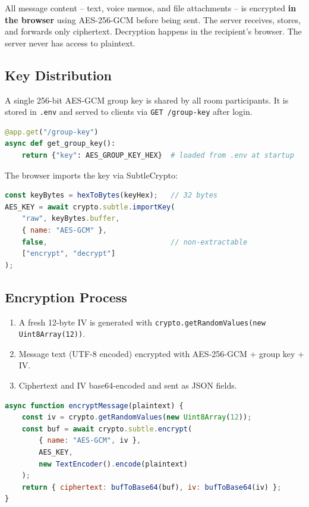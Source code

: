 \documentclass[12pt, a4paper]{article}
\begin{document}
All message content -- text, voice memos, and file attachments -- is encrypted \textbf{in the browser} using AES-256-GCM before being sent. The server receives, stores, and forwards only ciphertext. Decryption happens in the recipient's browser. The server never has access to plaintext.

\subsection{Key Distribution}

A single 256-bit AES-GCM group key is shared by all room participants. It is stored in \texttt{.env} and served to clients via \texttt{GET /group-key} after login.

\begin{lstlisting}[language=Python, caption={Group Key REST Endpoint (server.py)}]
@app.get("/group-key")
async def get_group_key():
    return {"key": AES_GROUP_KEY_HEX}  # loaded from .env at startup
\end{lstlisting}

The browser imports the key via SubtleCrypto:

\begin{lstlisting}[language=JavaScript, caption={AES Key Import in Browser (app.js)}]
const keyBytes = hexToBytes(keyHex);   // 32 bytes
AES_KEY = await crypto.subtle.importKey(
    "raw", keyBytes.buffer,
    { name: "AES-GCM" },
    false,                             // non-extractable
    ["encrypt", "decrypt"]
);
\end{lstlisting}

\subsection{Encryption Process}

\begin{enumerate}[leftmargin=*]
    \item A fresh 12-byte IV is generated with \texttt{crypto.getRandomValues(new Uint8Array(12))}.
    \item Message text (UTF-8 encoded) encrypted with AES-256-GCM + group key + IV.
    \item Ciphertext and IV base64-encoded and sent as JSON fields.
\end{enumerate}

\begin{lstlisting}[language=JavaScript, caption={Message Encryption (app.js)}]
async function encryptMessage(plaintext) {
    const iv = crypto.getRandomValues(new Uint8Array(12));
    const buf = await crypto.subtle.encrypt(
        { name: "AES-GCM", iv },
        AES_KEY,
        new TextEncoder().encode(plaintext)
    );
    return { ciphertext: bufToBase64(buf), iv: bufToBase64(iv) };
}
\end{lstlisting}
\end{document}
